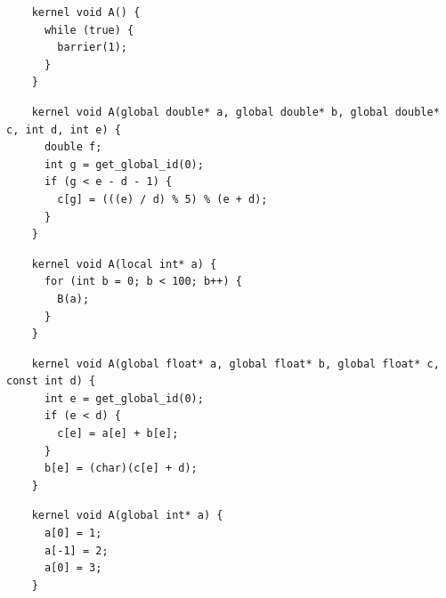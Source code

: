 \newsavebox{\IntelVectorizerSegfault}
\begin{lrbox}{\IntelVectorizerSegfault}
  \hspace{1.5em}
  \begin{lstlisting}
    kernel void A() {
      while (true) {
        barrier(1);
      }
    }
  \end{lstlisting}
\end{lrbox}

\newsavebox{\IntelSizetIntUnreduced}
\begin{lrbox}{\IntelSizetIntUnreduced}
  \hspace{1.5em}
  \begin{lstlisting}
    kernel void A(global double* a, global double* b, global double* c, int d, int e) {
      double f;
      int g = get_global_id(0);
      if (g < e - d - 1) {
        c[g] = (((e) / d) % 5) % (e + d);
      }
    }
  \end{lstlisting}
\end{lrbox}

\newsavebox{\PoclUndefinedSymbols}
\begin{lrbox}{\PoclUndefinedSymbols}
  \hspace{1.5em}
  \begin{lstlisting}
    kernel void A(local int* a) {
      for (int b = 0; b < 100; b++) {
        B(a);
      }
    }
  \end{lstlisting}
\end{lrbox}


\newsavebox{\BeignetCastError}
\begin{lrbox}{\BeignetCastError}
  \hspace{1.5em}
  \begin{lstlisting}
    kernel void A(global float* a, global float* b, global float* c, const int d) {
      int e = get_global_id(0);
      if (e < d) {
        c[e] = a[e] + b[e];
      }
      b[e] = (char)(c[e] + d);
    }
  \end{lstlisting}
\end{lrbox}

\newsavebox{\XeonPhiInvalidWrite}
\begin{lrbox}{\XeonPhiInvalidWrite}
  \hspace{1.5em}
  \begin{lstlisting}
    kernel void A(global int* a) {
      a[0] = 1;
      a[-1] = 2;
      a[0] = 3;
    }
  \end{lstlisting}
\end{lrbox}

